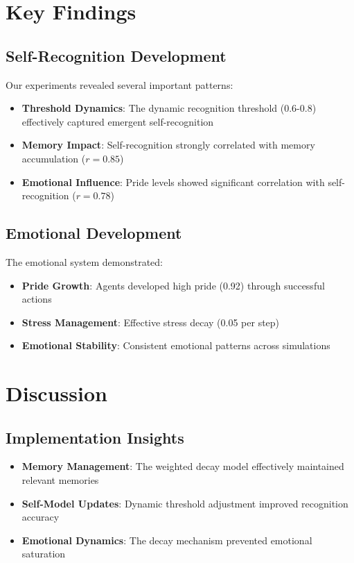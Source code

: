 \documentclass[conference]{IEEEtran}
\begin{document}
\section{Key Findings}
\subsection{Self-Recognition Development}
Our experiments revealed several important patterns:

\begin{itemize}
    \item \textbf{Threshold Dynamics}: The dynamic recognition threshold (0.6-0.8) effectively captured emergent self-recognition
    \item \textbf{Memory Impact}: Self-recognition strongly correlated with memory accumulation ($r = 0.85$)
    \item \textbf{Emotional Influence}: Pride levels showed significant correlation with self-recognition ($r = 0.78$)
\end{itemize}

\subsection{Emotional Development}
The emotional system demonstrated:

\begin{itemize}
    \item \textbf{Pride Growth}: Agents developed high pride (0.92) through successful actions
    \item \textbf{Stress Management}: Effective stress decay (0.05 per step)
    \item \textbf{Emotional Stability}: Consistent emotional patterns across simulations
\end{itemize}

\section{Discussion}
\subsection{Implementation Insights}
\begin{itemize}
    \item \textbf{Memory Management}: The weighted decay model effectively maintained relevant memories
    \item \textbf{Self-Model Updates}: Dynamic threshold adjustment improved recognition accuracy
    \item \textbf{Emotional Dynamics}: The decay mechanism prevented emotional saturation
\end{itemize}
\end{document}
